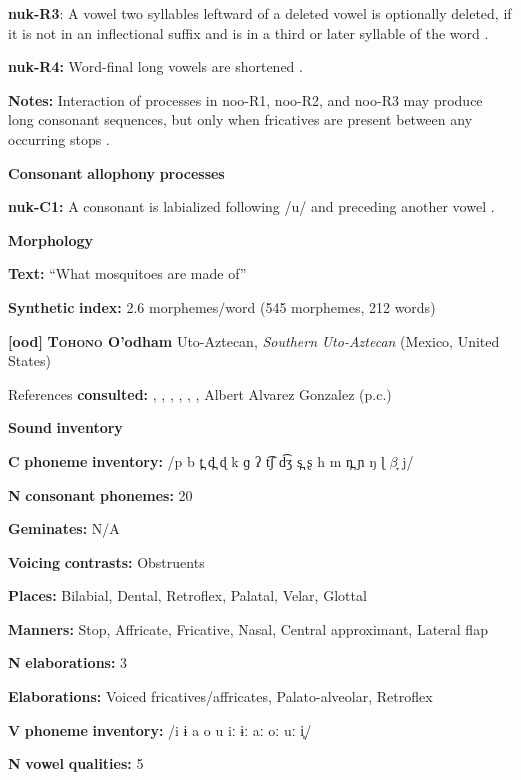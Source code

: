 \begin{styleBody}
\textbf{nuk-R3}: A vowel two syllables leftward of a deleted vowel is optionally deleted, if it is not in an inflectional suffix and is in a third or later syllable of the word \citep[25]{Rose1981}.

\textbf{nuk-R4:} Word-final long vowels are shortened \citep[27]{Rose1981}.

\textbf{Notes:} Interaction of processes in noo-R1, noo-R2, and noo-R3 may produce long consonant sequences, but only when fricatives are present between any occurring stops \citep[26]{Rose1981}.

\textbf{Consonant} \textbf{allophony} \textbf{processes}

\textbf{nuk-C1:} A consonant is labialized following /u/ and preceding another vowel \citep[27]{Stonham1999}.

\textbf{Morphology}

\textbf{Text:} “What mosquitoes are made of” \citep[133-143]{Stonham1999}

\textbf{Synthetic} \textbf{index:} 2.6 morphemes/word (545 morphemes, 212 words)

\textbf{[ood]}   \textbf{\textsc{Tohono} \textbf{O’odham}}  Uto-Aztecan, \textit{Southern} \textit{Uto-Aztecan} (Mexico, United States)

References \textbf{consulted:} \citet{DoloresMathiot1991}, \citet{Fitzgerald1994}, \citet{Hale1959}, \citet{HillZepeda1992}, \citet{Saxton1963}, \citet{Saxton1982}, Albert Alvarez Gonzalez (p.c.)

\textbf{Sound} \textbf{inventory}

\textbf{C} \textbf{phoneme} \textbf{inventory:} /p b t̪ d̪ ɖ k ɡ ʔ t͡ʃ d͡ʒ s̪ ʂ h m n̪ ɲ ŋ ɭ $\beta ̞$ j/

\textbf{N} \textbf{consonant} \textbf{phonemes:} 20

\textbf{Geminates:} N/A

\textbf{Voicing} \textbf{contrasts:} Obstruents

\textbf{Places:} Bilabial, Dental, Retroflex, Palatal, Velar, Glottal

\textbf{Manners:} Stop, Affricate, Fricative, Nasal, Central approximant, Lateral flap

\textbf{N} \textbf{elaborations:} 3

\textbf{Elaborations:} Voiced fricatives/affricates, Palato-alveolar, Retroflex

\textbf{V} \textbf{phoneme} \textbf{inventory:} /i ɨ a o u iː ɨː aː oː uː i̥/

\textbf{N} \textbf{vowel} \textbf{qualities:} 5


\end{styleBody}
